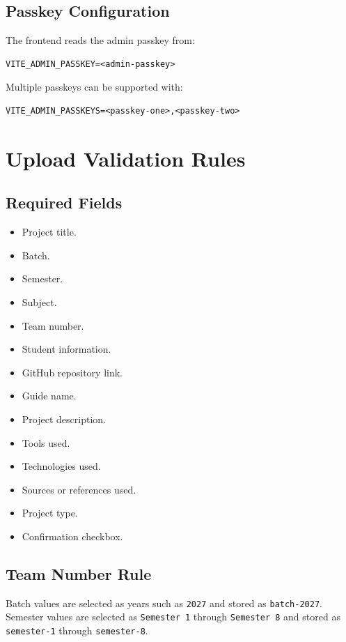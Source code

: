 \documentclass[12pt,a4paper]{article}
\begin{document}
\subsection{Passkey Configuration}

The frontend reads the admin passkey from:

\begin{lstlisting}
VITE_ADMIN_PASSKEY=<admin-passkey>
\end{lstlisting}

Multiple passkeys can be supported with:

\begin{lstlisting}
VITE_ADMIN_PASSKEYS=<passkey-one>,<passkey-two>
\end{lstlisting}

\section{Upload Validation Rules}

\subsection{Required Fields}

\begin{itemize}[leftmargin=*]
    \item Project title.
    \item Batch.
    \item Semester.
    \item Subject.
    \item Team number.
    \item Student information.
    \item GitHub repository link.
    \item Guide name.
    \item Project description.
    \item Tools used.
    \item Technologies used.
    \item Sources or references used.
    \item Project type.
    \item Confirmation checkbox.
\end{itemize}

\subsection{Team Number Rule}

Batch values are selected as years such as \texttt{2027} and stored as \texttt{batch-2027}. Semester values are selected as \texttt{Semester 1} through \texttt{Semester 8} and stored as \texttt{semester-1} through \texttt{semester-8}.
\end{document}
